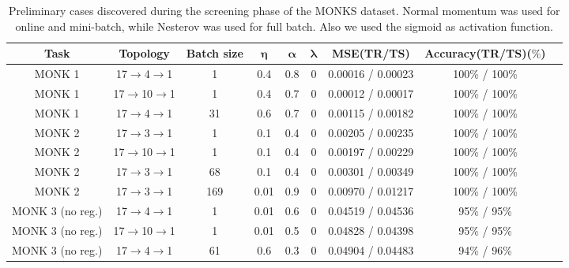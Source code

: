 \begin{appendices}
\begin{table}[h]
\small
    \centering
    \begin{tabular}{ |c|c|c|c|c|c|c|c|c|  }
      \hline
       \textbf{Task} &\textbf{Topology}&\textbf{Batch size}& $\boldsymbol{\eta}$ & $\boldsymbol{\alpha}$ & $\boldsymbol{\lambda}$& \textbf{MSE(TR/TS)} & \textbf{Accuracy(TR/TS)($\boldsymbol{\%}$)}\\
     \hline
    MONK 1 &17$\rightarrow$4$\rightarrow$1 & 1 & 0.4 & 0.8  & 0 & 0.00016 / 0.00023 & 100\% / 100\%\\
    \hline
    MONK 1 &17$\rightarrow$10$\rightarrow$1 & 1 & 0.4 & 0.7  & 0 & 0.00012 / 0.00017 & 100\% / 100\%\\
    \hline
    MONK 1 & 17$\rightarrow$4$\rightarrow$1 & 31 & 0.6 & 0.7  & 0 & 0.00115 / 0.00182 & 100\% / 100\%\\
    \hline
    MONK 2 & 17$\rightarrow$3$\rightarrow$1& 1 & 0.1 & 0.4  & 0 & 0.00205 / 0.00235 & 100\% / 100\%\\
    \hline
    MONK 2 & 17$\rightarrow$10$\rightarrow$1& 1 & 0.1 & 0.4  & 0 & 0.00197 / 0.00229 & 100\% / 100\%\\
    \hline
    MONK 2 & 17$\rightarrow$3$\rightarrow$1& 68 & 0.1 & 0.4  & 0 & 0.00301 / 0.00349 & 100\% / 100\%\\
    \hline
    MONK 2 & 17$\rightarrow$3$\rightarrow$1& 169 & 0.01 & 0.9  & 0 & 0.00970 / 0.01217 & 100\% / 100\%\\
    \hline
    MONK 3 (no reg.)&17$\rightarrow$4$\rightarrow$1 &1 & 0.01 & 0.6  & 0 & 0.04519 / 0.04536 & 95\% / 95\%\\
    \hline
    MONK 3 (no reg.)&17$\rightarrow$10$\rightarrow$1 &1 & 0.01 & 0.5  & 0 & 0.04828 / 0.04398 & 95\% / 95\%\\
    \hline
    MONK 3 (no reg.) & 17$\rightarrow$4$\rightarrow$1&61 &0.6 & 0.3 & 0 & 0.04904 / 0.04483 & 94\% / 96\%\\

     \hline
    \end{tabular}
    \caption{Preliminary cases discovered during the screening phase of the MONKS dataset. Normal momentum was used for online and mini-batch, while Nesterov was used for full batch. Also we used the sigmoid as activation function.}
    \label{tab:monk_screening}
\end{table}


\end{appendices}
